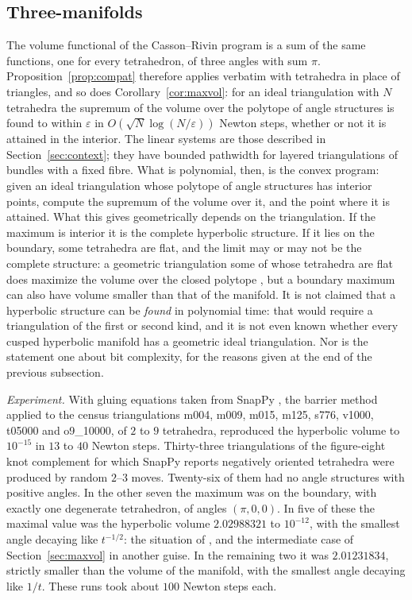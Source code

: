 \documentclass[11pt]{amsart}
\theoremstyle{definition}
\theoremstyle{remark}
\newcommand{\eps}{\varepsilon}
\begin{document}
\subsection{Three-manifolds}
The volume functional of the Casson--Rivin program is a sum of the same functions, one for every tetrahedron, of three angles with sum $\pi$. Proposition~\ref{prop:compat} therefore applies verbatim with tetrahedra in place of triangles, and so does Corollary~\ref{cor:maxvol}:
for an ideal triangulation with $N$ tetrahedra the supremum of the volume over the polytope of angle structures is found to within $\eps$ in $O(\sqrt N\log(N/\eps))$ Newton steps, whether or not it is attained in the interior. The linear systems are those described in Section~\ref{sec:context}; they have bounded pathwidth for layered triangulations of bundles with a fixed fibre.
What is polynomial, then, is the convex program: given an ideal triangulation whose polytope of angle structures has interior points, compute the supremum of the volume over it, and the point where it is attained. What this gives geometrically depends on the triangulation.
If the maximum is interior it is the complete hyperbolic structure. If it lies on the boundary, some tetrahedra are flat, and the limit may or may not be the complete structure: a geometric triangulation some of whose tetrahedra are flat does maximize the volume over the closed polytope \cite{Luo10}, but a boundary maximum can also have volume smaller than that of the manifold.
It is not claimed that a hyperbolic structure can be \emph{found} in polynomial time: that would require a triangulation of the first or second kind, and it is not even known whether every cusped hyperbolic manifold has a geometric ideal triangulation. Nor is the statement one about bit complexity, for the reasons given at the end of the previous subsection.

\emph{Experiment.} With gluing equations taken from SnapPy \cite{SnapPy}, the barrier method applied to the census triangulations m004, m009, m015, m125, s776, v1000, t05000 and o9\_10000, of $2$ to $9$ tetrahedra, reproduced the hyperbolic volume to $10^{-15}$ in $13$ to $40$ Newton steps.
Thirty-three triangulations of the figure-eight knot complement for which SnapPy reports negatively oriented tetrahedra were produced by random $2$--$3$ moves. Twenty-six of them had no angle structures with positive angles. In the other seven the maximum was on the boundary, with exactly one degenerate tetrahedron, of angles $(\pi,0,0)$.
In five of these the maximal value was the hyperbolic volume $2.02988321$ to $10^{-12}$, with the smallest angle decaying like $t^{-1/2}$: the situation of \cite{Luo10}, and the intermediate case of Section~\ref{sec:maxvol} in another guise.
In the remaining two it was $2.01231834$, strictly smaller than the volume of the manifold, with the smallest angle decaying like $1/t$. These runs took about $100$ Newton steps each.
\end{document}
